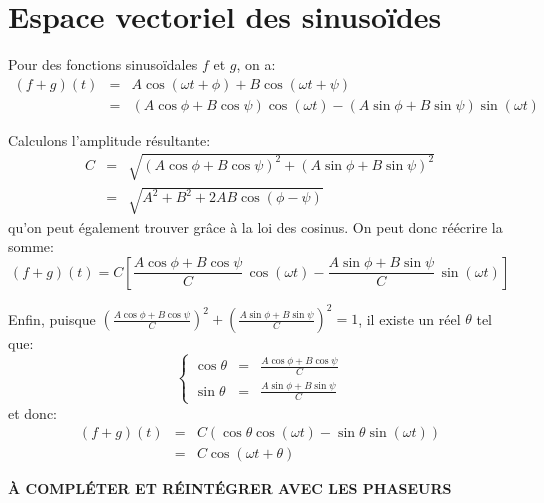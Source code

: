 \section{Espace vectoriel des sinusoïdes}
\label{app:espace-vect-sinus}

Pour des fonctions sinusoïdales $f$ et $g$, on a:
\[
    \begin{array}{rcl}
        (f+g)(t) &=& A\cos(\omega t + \phi) + B\cos(\omega t + \psi) \\
                 &=& (A\cos\phi+B\cos\psi)\cos(\omega t)
                     - (A\sin\phi+B\sin\psi)\sin(\omega t)
    \end{array}
\]

Calculons l'amplitude résultante:
\[
    \begin{array}{rcl}
        C &=& \sqrt{(A\cos\phi+B\cos\psi)^2+(A\sin\phi+B\sin\psi)^2} \\
          &=& \sqrt{A^2+B^2+2AB\cos(\phi-\psi)}
    \end{array}
\]
qu'on peut également trouver grâce à la loi des cosinus.
On peut donc réécrire la somme:
\[
    (f+g)(t) = C\left[ \frac{A\cos\phi+B\cos\psi}{C}\, \cos(\omega t)
                     - \frac{A\sin\phi+B\sin\psi}{C}\, \sin(\omega t) \right]
\]

Enfin, puisque $\left( \frac{A\cos\phi+B\cos\psi}{C} \right)^2
+ \left( \frac{A\sin\phi+B\sin\psi}{C} \right)^2 = 1$,
il existe un réel $\theta$ tel que:
\[
    \left\{
    \begin{array}{rcl}
        \cos\theta &=& \frac{A\cos\phi+B\cos\psi}{C} \\
        \sin\theta &=& \frac{A\sin\phi+B\sin\psi}{C}
    \end{array}
    \right.
\]
et donc:
\[
    \begin{array}{rcl}
        (f+g)(t) &=& C ( \cos\theta\cos(\omega t)
                       - \sin\theta\sin(\omega t) ) \\
                 &=& C\cos(\omega t + \theta)
    \end{array}
\]

\textbf{À COMPLÉTER ET RÉINTÉGRER AVEC LES PHASEURS}
